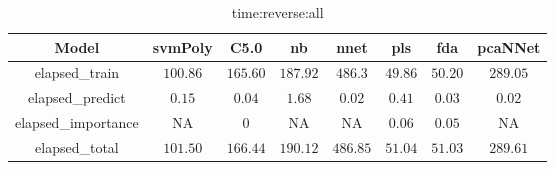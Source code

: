 \begin{table}[!ht]
	\centering
	\begin{tabular}{|c|c|c|c|c|c|c|c|}
		\hline
		Model & svmPoly & C5.0 & nb & nnet & pls & fda & pcaNNet \\ \hline
		elapsed_train & $100.86$ & $165.60$ & $187.92$ & $486.3$ & $49.86$ & $50.20$ & $289.05$ \\ \hline
		elapsed_predict & $0.15$ & $0.04$ & $1.68$ & $0.02$ & $0.41$ & $0.03$ & $0.02$ \\ \hline
		elapsed_importance & NA & $0$ & NA & NA & $0.06$ & $0.05$ & NA \\ \hline
		elapsed_total & $101.50$ & $166.44$ & $190.12$ & $486.85$ & $51.04$ & $51.03$ & $289.61$ \\ \hline
	\end{tabular}
	\caption{time:reverse:all}
	\label{tab:time:reverse:all}
\end{table}
